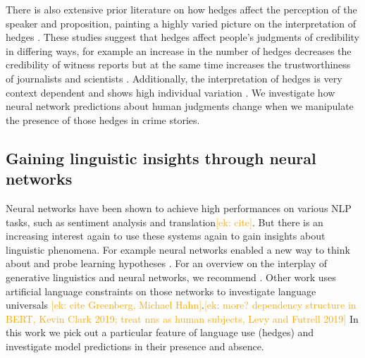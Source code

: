 \documentclass[11pt,a4paper]{article}
\newcommand{\ek}[1]{\textcolor{Orange}{[ek: #1]}}
\begin{document}
There is also extensive prior literature on how hedges affect the perception of the speaker and proposition, painting a highly varied picture on the interpretation of hedges \citep{Erickson-etal:1978, durik2008effects, bonnefon2006tactful, rubin:2007:ShortPapers, jensen2008scientific, ferson2015natural}. 
These studies suggest that hedges affect people's judgments of credibility in differing ways, for example an increase in the number of hedges decreases the credibility of witness reports \citep{Erickson-etal:1978} but at the same time increases the trustworthiness of journalists and scientists \citep{jensen2008scientific}. Additionally, the interpretation of hedges is very context dependent \citep{bonnefon2006tactful,durik2008effects,ferson2015natural} and shows high individual variation \citep{rubin:2007:ShortPapers,ferson2015natural}. 
We investigate how neural network predictions about human judgments change when we manipulate the presence of those hedges in crime stories.

\subsection{Gaining linguistic insights through neural networks}

Neural networks have been shown to achieve high performances on various NLP tasks, such as sentiment analysis and translation\ek{cite}. But there is an increasing interest again to use these systems again to gain insights about linguistic phenomena.
For example neural networks enabled a new way to think about and probe learning hypotheses \citep{tesar2000learnability, rumelhart1986learning}. For an overview on the interplay of generative linguistics and neural networks, we recommend \cite{pater2019generative}. Other work uses artificial language constraints on those networks to investigate language universals \ek{cite Greenberg, Michael Hahn}.\ek{more? dependency structure in BERT, Kevin Clark 2019; treat nns as human subjects, Levy and Futrell 2019}
In this work we pick out a particular feature of language use (hedges) and investigate model predictions in their presence and absence.
\end{document}
